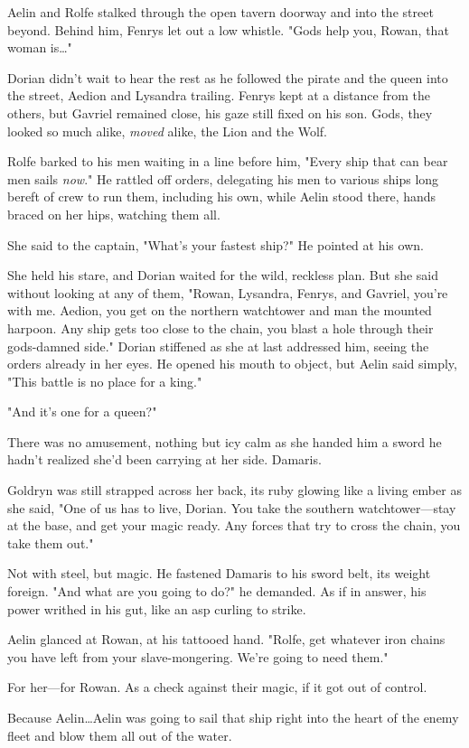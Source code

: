 Aelin and Rolfe stalked through the open tavern doorway and into the street beyond.
Behind him, Fenrys let out a low whistle.
"Gods help you, Rowan, that woman is\ldots"

Dorian didn't wait to hear the rest as he followed the pirate and the queen into the street, Aedion and Lysandra trailing.
Fenrys kept at a distance from the others, but Gavriel remained close, his gaze still fixed on his son.
Gods, they looked so much alike, \emph{moved} alike, the Lion and the Wolf.

Rolfe barked to his men waiting in a line before him, "Every ship that can bear men sails \emph{now}."
He rattled off orders, delegating his men to various ships long bereft of crew to run them, including his own, while Aelin stood there, hands braced on her hips, watching them all.

She said to the captain, "What's your fastest ship?"
He pointed at his own.

She held his stare, and Dorian waited for the wild, reckless plan.
But she said without looking at any of them, "Rowan, Lysandra, Fenrys, and Gavriel, you're with me.
Aedion, you get on the northern watchtower and man the mounted harpoon.
Any ship gets too close to the chain, you blast a hole through their gods-damned side."
Dorian stiffened as she at last addressed him, seeing the orders already in her eyes.
He opened his mouth to object, but Aelin said simply, "This battle is no place for a king."

"And it's one for a queen?"

There was no amusement, nothing but icy calm as she handed him a sword he hadn't realized she'd been carrying at her side.
Damaris.

Goldryn was still strapped across her back, its ruby glowing like a living ember as she said, "One of us has to live, Dorian.
You take the southern watchtower---stay at the base, and get your magic ready.
Any forces that try to cross the chain, you take them out."

Not with steel, but magic.
He fastened Damaris to his sword belt, its weight foreign.
"And what are you going to do?"
he demanded.
As if in answer, his power writhed in his gut, like an asp curling to strike.

Aelin glanced at Rowan, at his tattooed hand.
"Rolfe, get whatever iron chains you have left from your slave-mongering.
We're going to need them."

For her---for Rowan.
As a check against their magic, if it got out of control.

Because Aelin\ldots Aelin was going to sail that ship right into the heart of the enemy fleet and blow them all out of the water.
